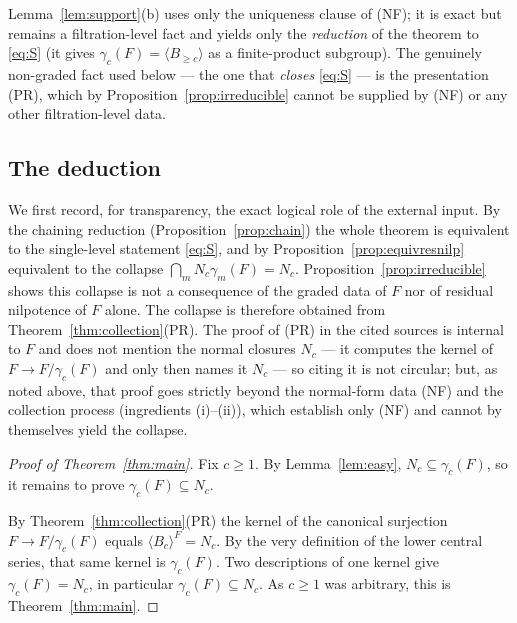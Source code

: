 \documentclass{amsart}
\theoremstyle{definition}
\theoremstyle{remark}
\begin{document}
\noindent Lemma~\ref{lem:support}(b) uses only the uniqueness clause of (NF); it is exact but
remains a filtration-level fact and yields only the \emph{reduction} of the theorem to
\eqref{eq:S} (it gives $\gamma_c(F)=\langle B_{\ge c}\rangle$ as a finite-product subgroup). The
genuinely non-graded fact used below --- the one that \emph{closes} \eqref{eq:S} --- is the
presentation (PR), which by Proposition~\ref{prop:irreducible} cannot be supplied by (NF) or any
other filtration-level data.

\subsection*{The deduction}

We first record, for transparency, the exact logical role of the external input. By the chaining
reduction (Proposition~\ref{prop:chain}) the whole theorem is equivalent to the single-level
statement \eqref{eq:S}, and by Proposition~\ref{prop:equivresnilp} equivalent to the collapse
$\bigcap_m N_c\gamma_m(F)=N_c$. Proposition~\ref{prop:irreducible} shows this collapse is not a
consequence of the graded data of $F$ nor of residual nilpotence of $F$ alone. The collapse is
therefore obtained from Theorem~\ref{thm:collection}(PR). The proof of (PR) in the cited sources
is internal to $F$ and does not mention the normal closures $N_c$ --- it computes the kernel of
$F\to F/\gamma_c(F)$ and only then names it $N_c$ --- so citing it is not circular; but, as noted
above, that proof goes strictly beyond the normal-form data (NF) and the collection process
\textup{(ingredients (i)--(ii))}, which establish only (NF) and cannot by themselves yield the
collapse.

\begin{proof}[Proof of Theorem~\ref{thm:main}]
Fix $c\ge1$. By Lemma~\ref{lem:easy}, $N_c\subseteq\gamma_c(F)$, so it remains to prove
$\gamma_c(F)\subseteq N_c$.

By Theorem~\ref{thm:collection}(PR) the kernel of the canonical surjection $F\to F/\gamma_c(F)$
equals $\langle B_c\rangle^{F}=N_c$. By the very definition of the lower central series, that same
kernel is $\gamma_c(F)$. Two descriptions of one kernel give $\gamma_c(F)=N_c$, in particular
$\gamma_c(F)\subseteq N_c$. As $c\ge1$ was arbitrary, this is Theorem~\ref{thm:main}.
\end{proof}
\end{document}
